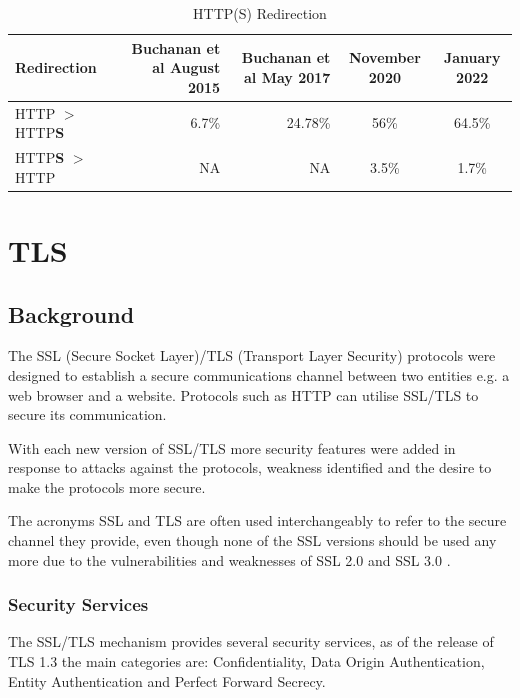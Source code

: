 \documentclass{mscreport}
\begin{document}
\begin{table}[t]
\footnotesize
  \begin{center}
    \begin{tabular}{|l|D|D|c|c|}  %
      \hline
      \textbf{Redirection} & \textbf{Buchanan et al} \cite{Buchanan2018-xz} August 2015 & \textbf{Buchanan et al} \cite{Buchanan2018-xz} May 2017 & November 2020 & January 2022 \\
      \hline
	  HTTP $>$ HTTP\textbf{S} & 6.7\% & 24.78\% & 56\% & 64.5\%\\
	  \hline
 	  HTTP\textbf{S} $>$ HTTP & NA & NA & 3.5\% & 1.7\%\\
      \hline
    \end{tabular}
    \caption{HTTP(S) Redirection}
    \label{table:http_redirection} %
  \end{center}
\end{table}


\newpage


\section{TLS}
\label{section:ssl_tls}

\subsection{Background}
\noindent The SSL (Secure Socket Layer)/TLS (Transport Layer Security) protocols were designed to establish a secure communications channel between two entities e.g. a web browser and a website. Protocols such as HTTP can utilise SSL/TLS to secure its communication.

\vspace{0.3cm} \noindent
With each new version of SSL/TLS more security features were added in response to attacks against the protocols, weakness identified and the desire to make the protocols more secure.

\vspace{0.3cm} \noindent
The acronyms SSL and TLS are often used interchangeably to refer to the secure channel they provide, even though none of the SSL versions should be used any more due to the vulnerabilities and weaknesses of SSL 2.0 and SSL 3.0 \cite{Oppliger2016-ig}.

\subsubsection{Security Services}
\noindent The SSL/TLS mechanism provides several security services, as of the release of TLS 1.3 the main categories are: Confidentiality, Data Origin Authentication, Entity Authentication and Perfect Forward Secrecy.
\end{document}
